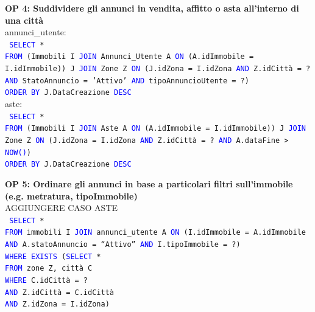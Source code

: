 \documentclass[a4paper,12pt]{report}
\begin{document}
            \noindent
            \textbf{OP 4: Suddividere gli annunci in vendita, affitto o asta all’interno di una città} \\
            annunci\_utente: \\
            \texttt{
                \textcolor{blue}{SELECT} * \\
                \textcolor{blue}{FROM} (Immobili I \textcolor{blue}{JOIN} Annunci\_Utente A \textcolor{blue}{ON} (A.idImmobile = I.idImmobile)) J \textcolor{blue}{JOIN} Zone Z \textcolor{blue}{ON} (J.idZona = I.idZona \textcolor{blue}{AND} Z.idCittà = ? \textcolor{blue}{AND} StatoAnnuncio = 'Attivo' \textcolor{blue}{AND} tipoAnnuncioUtente = ?) \\
                \textcolor{blue}{ORDER BY} J.DataCreazione  \textcolor{blue}{DESC} \\
            }
            aste: \\
            \texttt{
                \textcolor{blue}{SELECT} * \\
                \textcolor{blue}{FROM} (Immobili I \textcolor{blue}{JOIN} Aste A \textcolor{blue}{ON} (A.idImmobile = I.idImmobile)) J \textcolor{blue}{JOIN} Zone Z \textcolor{blue}{ON} (J.idZona = I.idZona \textcolor{blue}{AND} Z.idCittà = ? \textcolor{blue}{AND} A.dataFine > \textcolor{blue}{NOW()}) \\
                \textcolor{blue}{ORDER BY} J.DataCreazione  \textcolor{blue}{DESC} \\
            }

            \noindent
            \textbf{OP 5: Ordinare gli annunci in base a particolari filtri sull'immobile (e.g. metratura, tipoImmobile)} \\
            AGGIUNGERE CASO ASTE \\
            \texttt{
                \textcolor{blue}{SELECT} * \\
                \textcolor{blue}{FROM} immobili I \textcolor{blue}{JOIN} annunci\_utente A \textcolor{blue}{ON} (I.idImmobile = A.idImmobile \textcolor{blue}{AND} A.statoAnnuncio = “Attivo” \textcolor{blue}{AND} I.tipoImmobile = ?) \\
                \textcolor{blue}{WHERE} \textcolor{blue}{EXISTS} (\textcolor{blue}{SELECT} * \\
                    \null\qquad\qquad\qquad\quad\textcolor{blue}{FROM} zone Z, città C \\
                    \null\qquad\qquad\qquad\quad\textcolor{blue}{WHERE} C.idCittà = ? \\
                    \null\qquad\qquad\qquad\quad\textcolor{blue}{AND} Z.idCittà = C.idCittà \\
                    \null\qquad\qquad\qquad\quad\textcolor{blue}{AND} Z.idZona = I.idZona) \\
            }
\end{document}
